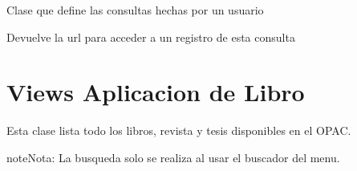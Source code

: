 \documentclass[letterpaper,10pt,spanish]{sphinxmanual}
\begin{document}
\begin{fulllineitems}
\label{\detokenize{modules/consulta/models:consulta.models.Consulta}}
Clase que define las consultas hechas por un usuario

\begin{fulllineitems}
\label{\detokenize{modules/consulta/models:consulta.models.Consulta.DoesNotExist}}
\end{fulllineitems}


\begin{fulllineitems}
\label{\detokenize{modules/consulta/models:consulta.models.Consulta.MultipleObjectsReturned}}
\end{fulllineitems}


\begin{fulllineitems}
\label{\detokenize{modules/consulta/models:consulta.models.Consulta.get_absolute_url}}
Devuelve la url para acceder a un registro de esta consulta

\end{fulllineitems}


\end{fulllineitems}



\section{Views Aplicacion de Libro}
\label{\detokenize{modules/libro/views:module-libro.views}}\label{\detokenize{modules/libro/views:views-aplicacion-de-libro}}\label{\detokenize{modules/libro/views::doc}}

\begin{fulllineitems}
\label{\detokenize{modules/libro/views:libro.views.ConsultaTodo}}
Esta clase lista todo los libros, revista y tesis disponibles en el OPAC.

\begin{sphinxadmonition}{note}{Nota:}
La busqueda solo se realiza al usar el buscador del menu.
\end{sphinxadmonition}

\end{fulllineitems}
\end{document}
